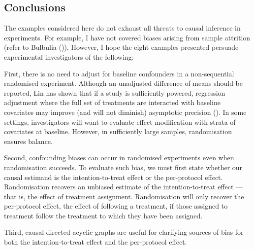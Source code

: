 \documentclass[
  single column]{article}
\begin{document}
\subsection{Conclusions}\label{conclusions}

The examples considered here do not exhaust all threats to causal
inference in experiments. For example, I have not covered biases arising
from sample attrition (refer to Bulbulia
()). However, I hope the eight
examples presented persuade experimental investigators of the following:

First, there is no need to adjust for baseline confounders in a
non-sequential randomised experiment. Although an unadjusted difference
of means should be reported, Lin has shown that if a study is
sufficiently powered, regression adjustment where the full set of
treatments are interacted with baseline covariates may improve (and will
not diminish) asymptotic precision
(). In some settings,
investigators will want to evaluate effect modification with strata of
covariates at baseline. However, in sufficiently large samples,
randomisation ensures balance.

Second, confounding biases can occur in randomised experiments even when
randomisation succeeds. To evaluate such bias, we must first state
whether our causal estimand is the intention-to-treat effect or the
per-protocol effect. Randomisation recovers an unbiased estimate of the
intention-to-treat effect --- that is, the effect of treatment
assignment. Randomisation will only recover the per-protocol effect, the
effect of following a treatment, if those assigned to treatment follow
the treatment to which they have been assigned.

Third, causal directed acyclic graphs are useful for clarifying sources
of bias for both the intention-to-treat effect and the per-protocol
effect.
\end{document}
